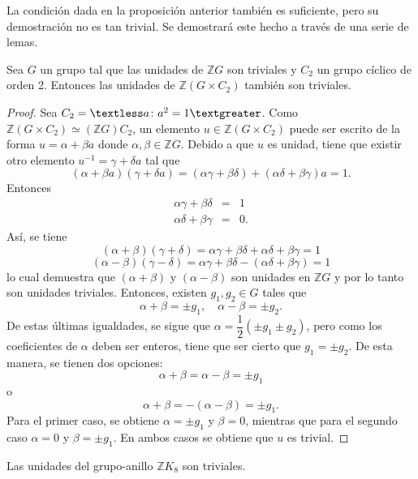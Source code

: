 La condición dada en la proposición anterior también es suficiente, pero su demostración no es tan trivial. Se demostrará este hecho a través de una serie de lemas.
\begin{lema}\label{lema:primerLema}
Sea $G$ un grupo tal que las unidades de $\mathds{Z}G$ son triviales y $C_2$ un grupo cíclico de orden 2. Entonces las unidades de $\mathds{Z}(G \times C_2)$ también son triviales. 
\end{lema}
\begin{proof}
Sea $C_2 = \textless a \colon a^2 = 1 \textgreater$. Como $\mathds{Z}(G\times C_2) \simeq (\mathds{Z}G)C_2$, un elemento $u \in \mathds{Z}(G\times C_2)$ puede ser escrito de la forma $u = \alpha + \beta a$ donde $\alpha,\beta \in \mathds{Z}G$. Debido a que $u$ es unidad, tiene que existir otro elemento $u^{-1} = \gamma +\delta a$ tal que \[  (\alpha + \beta a)(\gamma + \delta a) = (\alpha \gamma + \beta \delta)+(\alpha\delta + \beta\gamma)a =1. \] Entonces 
\begin{eqnarray*}
\alpha\gamma +\beta\delta &=& 1 \\ 
\alpha\delta + \beta\gamma  &=& 0.
\end{eqnarray*} Así, se tiene
\[ (\alpha + \beta)(\gamma + \delta) = \alpha\gamma + \beta\delta + \alpha\delta + \beta\gamma = 1  \]
\[ (\alpha - \beta)(\gamma - \delta) = \alpha\gamma + \beta\delta -( \alpha\delta + \beta\gamma) = 1  \] lo cual demuestra que $(\alpha + \beta)$ y $(\alpha -\beta)$ son unidades en $\mathds{Z}G$ y por lo tanto son unidades triviales. Entonces, existen $g_1,g_2 \in G$ tales que \[ \alpha + \beta = \pm g_1, \quad \alpha -\beta = \pm g_2.\] 
De estas últimas igualdades, se sigue que $\alpha = \dfrac{1}{2}(\pm g_1 \pm g_2)$, pero como los coeficientes de $\alpha$ deben ser enteros, tiene que ser cierto que $g_1 = \pm g_2$.
De esta manera, se tienen dos opciones: \[ \alpha +\beta = \alpha - \beta = \pm g_1 \] o \[ \alpha +\beta = -(\alpha -\beta) = \pm g_1. \]
Para el primer caso, se obtiene $\alpha = \pm g_1$ y $\beta = 0$, mientras que para el segundo caso $\alpha =0$ y $\beta = \pm g_1$. En ambos casos se obtiene que $u$ es trivial. 
\end{proof}
\begin{lema}\label{lema:segundoLema}
Las unidades del grupo-anillo $\mathds{Z}K_8$ son triviales. 
\end{lema} 
